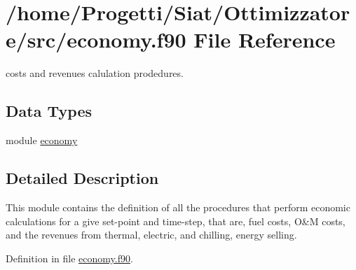 \hypertarget{economy_8f90}{\section{/home/\-Progetti/\-Siat/\-Ottimizzatore/src/economy.f90 File Reference}
\label{economy_8f90}
}


costs and revenues calulation prodedures.  


\subsection*{Data Types}
\begin{DoxyCompactItemize}
\item 
module \hyperlink{classeconomy}{economy}
\end{DoxyCompactItemize}


\subsection{Detailed Description}
This module contains the definition of all the procedures that perform economic calculations for a give set-\/point and time-\/step, that are, fuel costs, O\&M costs, and the revenues from thermal, electric, and chilling, energy selling. 

Definition in file \hyperlink{economy_8f90_source}{economy.\-f90}.

